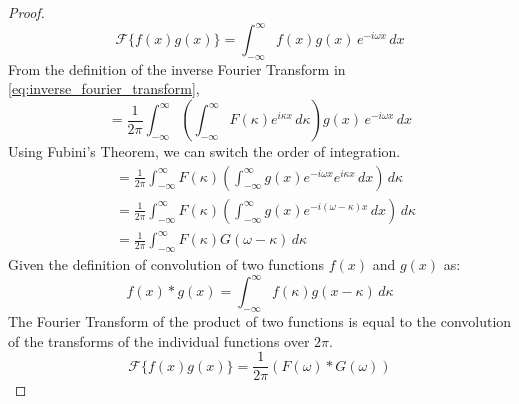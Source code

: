 \begin{proof}
    \[ \mathcal{F}\{ f(x) g(x) \} = \int_{-\infty}^{\infty} f(x) g(x) \, e^{-i \omega x} \,dx \]
    From the definition of the inverse Fourier Transform in \cref{eq:inverse_fourier_transform},
    \[ = \frac{1}{2 \pi} \int_{-\infty}^{\infty} \left( \int_{-\infty}^{\infty} F(\kappa) e^{i \kappa x} \,d\kappa \right) g(x) \, e^{-i \omega x} \,dx \]
    Using Fubini's Theorem, we can switch the order of integration.
    \begin{align*}
        &= \frac{1}{2 \pi} \int_{-\infty}^{\infty} F(\kappa) \left( \int_{-\infty}^{\infty} g(x) e^{-i \omega x} e^{i \kappa x} \,dx \right) \,d\kappa \\
        &= \frac{1}{2 \pi} \int_{-\infty}^{\infty} F(\kappa) \left( \int_{-\infty}^{\infty} g(x) e^{-i (\omega - \kappa) x} \,dx \right) \,d\kappa \\
        &= \frac{1}{2 \pi} \int_{-\infty}^{\infty} F(\kappa) G(\omega - \kappa) \,d\kappa
    \end{align*}
    Given the definition of convolution of two functions \(f(x)\) and \(g(x)\) as:
    \[ f(x) * g(x) = \int_{-\infty}^{\infty} f(\kappa) g(x-\kappa) \,d\kappa \]
    The Fourier Transform of the product of two functions is equal to the convolution of the transforms of the individual functions over \(2 \pi\).
    \[ \mathcal{F}\{ f(x) g(x) \} = \frac{1}{2 \pi}( F(\omega) * G(\omega) ) \]
\end{proof}